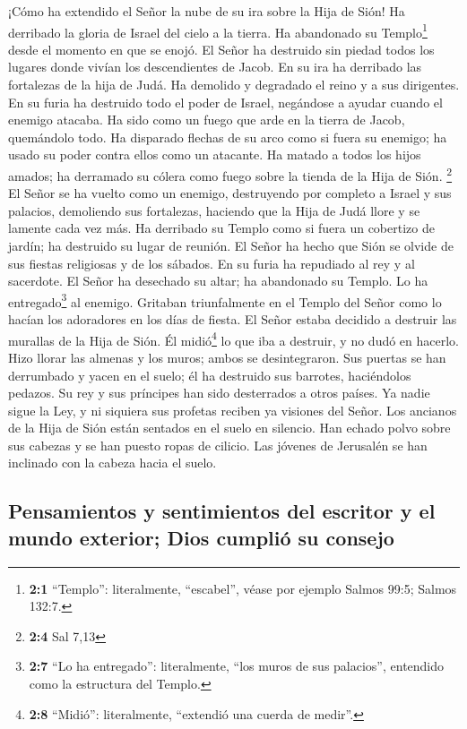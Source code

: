  ¡Cómo ha extendido el Señor la nube de su ira sobre la
Hija de Sión! Ha derribado la gloria de Israel del cielo a la tierra. Ha
abandonado su Templo\footnote{\textbf{2:1} ``Templo'': literalmente,
  ``escabel'', véase por ejemplo Salmos 99:5; Salmos 132:7.} desde el
momento en que se enojó.  El Señor ha destruido sin piedad
todos los lugares donde vivían los descendientes de Jacob. En su ira ha
derribado las fortalezas de la hija de Judá. Ha demolido y degradado el
reino y a sus dirigentes.  En su furia ha destruido todo
el poder de Israel, negándose a ayudar cuando el enemigo atacaba. Ha
sido como un fuego que arde en la tierra de Jacob, quemándolo todo.
 Ha disparado flechas de su arco como si fuera su enemigo;
ha usado su poder contra ellos como un atacante. Ha matado a todos los
hijos amados; ha derramado su cólera como fuego sobre la tienda de la
Hija de Sión. \footnote{\textbf{2:4} Sal 7,13}  El Señor
se ha vuelto como un enemigo, destruyendo por completo a Israel y sus
palacios, demoliendo sus fortalezas, haciendo que la Hija de Judá llore
y se lamente cada vez más.  Ha derribado su Templo como si
fuera un cobertizo de jardín; ha destruido su lugar de reunión. El Señor
ha hecho que Sión se olvide de sus fiestas religiosas y de los sábados.
En su furia ha repudiado al rey y al sacerdote.  El Señor
ha desechado su altar; ha abandonado su Templo. Lo ha
entregado\footnote{\textbf{2:7} ``Lo ha entregado'': literalmente, ``los
  muros de sus palacios'', entendido como la estructura del Templo.} al
enemigo. Gritaban triunfalmente en el Templo del Señor como lo hacían
los adoradores en los días de fiesta.  El Señor estaba
decidido a destruir las murallas de la Hija de Sión. Él midió\footnote{\textbf{2:8}
  ``Midió'': literalmente, ``extendió una cuerda de medir''.} lo que iba
a destruir, y no dudó en hacerlo. Hizo llorar las almenas y los muros;
ambos se desintegraron.  Sus puertas se han derrumbado y
yacen en el suelo; él ha destruido sus barrotes, haciéndolos pedazos. Su
rey y sus príncipes han sido desterrados a otros países. Ya nadie sigue
la Ley, y ni siquiera sus profetas reciben ya visiones del Señor.
 Los ancianos de la Hija de Sión están sentados en el
suelo en silencio. Han echado polvo sobre sus cabezas y se han puesto
ropas de cilicio. Las jóvenes de Jerusalén se han inclinado con la
cabeza hacia el suelo.

\hypertarget{pensamientos-y-sentimientos-del-escritor-y-el-mundo-exterior-dios-cumpliuxf3-su-consejo}{%
\subsection{Pensamientos y sentimientos del escritor y el mundo
exterior; Dios cumplió su
consejo}\label{pensamientos-y-sentimientos-del-escritor-y-el-mundo-exterior-dios-cumpliuxf3-su-consejo}}

